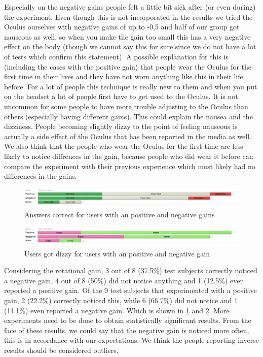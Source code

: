 Especially on the negative gains people felt a little bit sick after (or even during) the experiment.
Even though this is not incorporated in the results we tried the Oculus ourselves with negative gains of up to -0,5 and half of our group got nauseous as well, so when you make the gain too small this has a very negative effect on the body (though we cannot say this for sure since we do not have a lot of tests which confirm this statement).
A possible explanation for this is (including the cases with the positive gain) that people wear the Oculus for the first time in their lives and they have not worn anything like this in their life before.
For a lot of people this technique is really new to them and when you put on the headset a lot of people first have to get used to the Oculus. 
It is not uncommon for some people to have more trouble adjusting to the Oculus than others (especially having different gains).
This could explain the nausea and the dizziness.
People becoming slightly dizzy to the point of feeling nauseous is actually a side effect of the Oculus that has been reported in the media as well.
We also think that the people who wear the Oculus  for the first time are less likely to notice diffrences in the gain, because people who did wear it before can compare the experiment with their previous experience which most likely had no differences in the gains. 

\begin{figure}[htb]
	\centering
	\includegraphics[width=\linewidth]{sections/finalreport/images/graph1.png}	
	\caption{Answers correct for users with an positive and negative gains}
	\label{fig:grp1}
\end{figure}
\begin{figure}[htb]
	\centering
	\includegraphics[width=\linewidth]{sections/finalreport/images/graph2.png}	
	\caption{Users got dizzy for users with an positive and negative gain}
	\label{fig:grp2}
\end{figure}

Considering the rotational gain, 3 out of 8 (37.5\%) test subjects correctly noticed a negative gain, 4 out of 8 (50\%) did not notice anything and 1 (12.5\%) even reported a positive gain.
Of the 9 test subjects that experimented with a positive gain, 2 (22.2\%) correctly noticed this, while 6 (66.7\%) did not notice and 1 (11.1\%) even reported a negative gain. Which is shown in  \ref{fig:grp1} and \ref{fig:grp2}.
More experiments need to be done to obtain statistically significant results.
From the face of these results, we could say that the negative gain is noticed more often, this is in accordance with our expectations.
We think the people reporting inverse results should be considered outliers.

